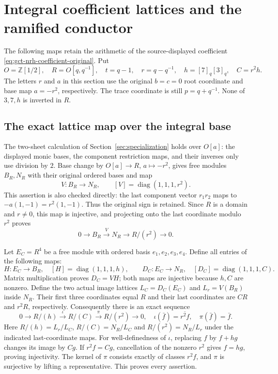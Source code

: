 \section{Integral coefficient lattices and the ramified conductor}
\label{sec:integral-coefficient-conductor}

The following maps retain the arithmetic of the source-displayed coefficient
\eqref{eq:gct-nrh-coefficient-original}. Put
\[
 O=\mathbb Z[1/2],\quad R=O[q,q^{-1}],\quad t=q-1,\quad
 r=q-q^{-1},\quad h=[7]_q[3]_q,\quad C=r^2h.
\]
The letters $r$ and $a$ in this section use the original $b=c=0$
root coordinate and base map $a=-r^2$, respectively. The trace coordinate
is still $p=q+q^{-1}$. None of $3,7,h$ is inverted in $R$.

\subsection{The exact lattice map over the integral base}

The two-sheet calculation of Section~\ref{sec:specialization} holds over
$O[a]$: the displayed monic bases, the component restriction maps, and
their inverses only use division by $2$. Base change by
$O[a]\to R$, $a\mapsto-r^2$, gives free modules $B_R,N_R$ with their
original ordered bases and map
\[
 V:B_R\longrightarrow N_R,\qquad [V]=\operatorname{diag}(1,1,1,r^2).
\]
This assertion is also checked directly: the last component vector
$r_1r_2$ maps to $-a(1,-1)=r^2(1,-1)$. Thus the original sign is retained.
Since $R$ is a domain and $r\ne0$, this map is injective, and projecting
onto the last coordinate modulo $r^2$ proves
\[
 0\longrightarrow B_R\xrightarrow{V}N_R
 \longrightarrow R/(r^2)\longrightarrow0.
\]

Let $E_C=R^4$ be a free module with ordered basis $e_1,e_2,e_3,e_4$.
Define all entries of the following maps:
\[
 H:E_C\longrightarrow B_R,\quad[H]=\operatorname{diag}(1,1,1,h),
 \qquad D_C:E_C\longrightarrow N_R,\quad[D_C]=\operatorname{diag}(1,1,1,C).
\]
Matrix multiplication proves $D_C=VH$; both maps are injective because
$h,C$ are nonzero. Define the two actual image lattices
$L_C=D_C(E_C)$ and $L_r=V(B_R)$ inside $N_R$.
Their first three coordinates equal $R$ and their last coordinates are
$CR$ and $r^2R$, respectively. Consequently there is an exact sequence
\begin{equation}\label{eq:integral-lattice-sequence}
 0\longrightarrow R/(h)\xrightarrow{\iota}R/(C)
 \xrightarrow{\pi}R/(r^2)\longrightarrow0,
 \quad \iota(\bar f)=\overline{r^2f},\quad\pi(\bar f)=\bar f.
\end{equation}
Here $R/(h)=L_r/L_C$, $R/(C)=N_R/L_C$ and $R/(r^2)=N_R/L_r$ under
the indicated last-coordinate maps. For well-definedness of $\iota$,
replacing $f$ by $f+hg$ changes its image by $Cg$. If $r^2f=Cg$,
cancellation of the nonzero $r^2$ gives $f=hg$, proving injectivity.
The kernel of $\pi$ consists exactly of classes $r^2f$, and $\pi$ is
surjective by lifting a representative. This proves every assertion.

